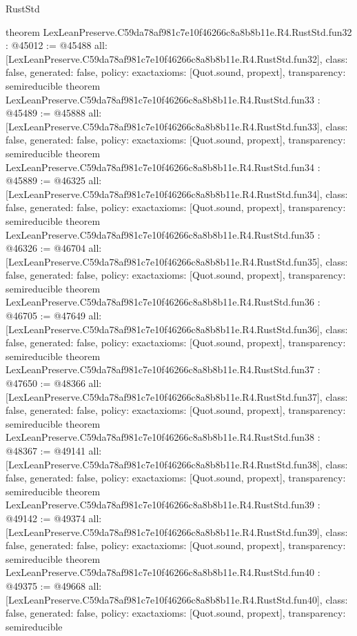 \begin{lexlean}{RustStd}
\begin{coremodule}
{}
theorem LexLeanPreserve.C59da78af981c7e10f46266c8a8b8b11e.R4.RustStd.fun32 : @45012 := @45488 {
  all: [LexLeanPreserve.C59da78af981c7e10f46266c8a8b8b11e.R4.RustStd.fun32],
  class: false,
  generated: false,
  policy: exact{axioms: [Quot.sound, propext]},
  transparency: semireducible
}
theorem LexLeanPreserve.C59da78af981c7e10f46266c8a8b8b11e.R4.RustStd.fun33 : @45489 := @45888 {
  all: [LexLeanPreserve.C59da78af981c7e10f46266c8a8b8b11e.R4.RustStd.fun33],
  class: false,
  generated: false,
  policy: exact{axioms: [Quot.sound, propext]},
  transparency: semireducible
}
theorem LexLeanPreserve.C59da78af981c7e10f46266c8a8b8b11e.R4.RustStd.fun34 : @45889 := @46325 {
  all: [LexLeanPreserve.C59da78af981c7e10f46266c8a8b8b11e.R4.RustStd.fun34],
  class: false,
  generated: false,
  policy: exact{axioms: [Quot.sound, propext]},
  transparency: semireducible
}
theorem LexLeanPreserve.C59da78af981c7e10f46266c8a8b8b11e.R4.RustStd.fun35 : @46326 := @46704 {
  all: [LexLeanPreserve.C59da78af981c7e10f46266c8a8b8b11e.R4.RustStd.fun35],
  class: false,
  generated: false,
  policy: exact{axioms: [Quot.sound, propext]},
  transparency: semireducible
}
theorem LexLeanPreserve.C59da78af981c7e10f46266c8a8b8b11e.R4.RustStd.fun36 : @46705 := @47649 {
  all: [LexLeanPreserve.C59da78af981c7e10f46266c8a8b8b11e.R4.RustStd.fun36],
  class: false,
  generated: false,
  policy: exact{axioms: [Quot.sound, propext]},
  transparency: semireducible
}
theorem LexLeanPreserve.C59da78af981c7e10f46266c8a8b8b11e.R4.RustStd.fun37 : @47650 := @48366 {
  all: [LexLeanPreserve.C59da78af981c7e10f46266c8a8b8b11e.R4.RustStd.fun37],
  class: false,
  generated: false,
  policy: exact{axioms: [Quot.sound, propext]},
  transparency: semireducible
}
theorem LexLeanPreserve.C59da78af981c7e10f46266c8a8b8b11e.R4.RustStd.fun38 : @48367 := @49141 {
  all: [LexLeanPreserve.C59da78af981c7e10f46266c8a8b8b11e.R4.RustStd.fun38],
  class: false,
  generated: false,
  policy: exact{axioms: [Quot.sound, propext]},
  transparency: semireducible
}
theorem LexLeanPreserve.C59da78af981c7e10f46266c8a8b8b11e.R4.RustStd.fun39 : @49142 := @49374 {
  all: [LexLeanPreserve.C59da78af981c7e10f46266c8a8b8b11e.R4.RustStd.fun39],
  class: false,
  generated: false,
  policy: exact{axioms: [Quot.sound, propext]},
  transparency: semireducible
}
theorem LexLeanPreserve.C59da78af981c7e10f46266c8a8b8b11e.R4.RustStd.fun40 : @49375 := @49668 {
  all: [LexLeanPreserve.C59da78af981c7e10f46266c8a8b8b11e.R4.RustStd.fun40],
  class: false,
  generated: false,
  policy: exact{axioms: [Quot.sound, propext]},
  transparency: semireducible
}
\end{coremodule}
\end{lexlean}
